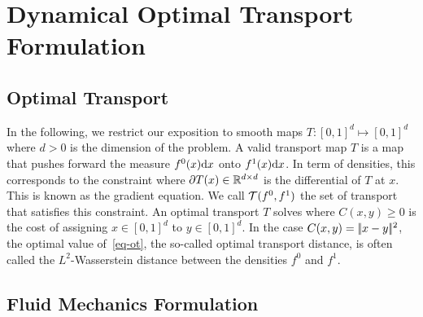 \section{Dynamical Optimal Transport Formulation}


\subsection{Optimal Transport}

In the following, we restrict our exposition to smooth maps $T : [0,1]^d \mapsto [0,1]^d$ where $d>0$ is the dimension of the problem. A valid transport map $T$ is a map that  pushes forward the measure $f^0(x) \mathrm{d} x$ onto $f^1(x) \mathrm{d} x$. In term of densities, this corresponds to
the constraint
where $\partial T(x) \in \mathbb{R}^{d \times d}$ is the differential of $T$
at $x$. This is known as the gradient equation. We call $\mathcal{T}(f^0,f^1)$ the set of transport that satisfies this constraint.
An optimal transport $T$ solves
where $C(x,y) \geq 0$ is the cost of assigning $x \in [0,1]^d$ to $y \in [0,1]^d$. 
In the case $C(x,y)=|\!| x-y |\!|^2$, the optimal value of~\eqref{eq-ot}, the so-called optimal transport distance, is often called the  $L^2$-Wasserstein distance between the densities $f^0$ and $f^1$.


\subsection{Fluid Mechanics Formulation}

